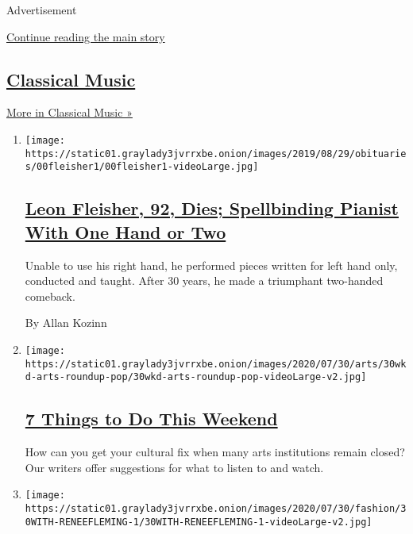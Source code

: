 Advertisement

\protect\hyperlink{after-mid1}{Continue reading the main story}

\hypertarget{classical-music}{%
\subsection{\texorpdfstring{\href{/spotlight/classical-music-reviews}{Classical
Music}}{Classical Music}}\label{classical-music}}

\href{/spotlight/classical-music-reviews}{More in Classical Music »}

\begin{enumerate}
\def\labelenumi{\arabic{enumi}.}
\item
  \texttt{[image: https://static01.graylady3jvrrxbe.onion/images/2019/08/29/obituaries/00fleisher1/00fleisher1-videoLarge.jpg]}

  \hypertarget{leon-fleisher-92-dies-spellbinding-pianist-with-one-hand-or-two}{%
  \subsection{\texorpdfstring{\href{/2020/08/02/arts/music/leon-fleisher-dead.html}{Leon
  Fleisher, 92, Dies; Spellbinding Pianist With One Hand or
  Two}}{Leon Fleisher, 92, Dies; Spellbinding Pianist With One Hand or Two}}\label{leon-fleisher-92-dies-spellbinding-pianist-with-one-hand-or-two}}

  Unable to use his right hand, he performed pieces written for left
  hand only, conducted and taught. After 30 years, he made a triumphant
  two-handed comeback.

  By Allan Kozinn
\item
  \texttt{[image: https://static01.graylady3jvrrxbe.onion/images/2020/07/30/arts/30wkd-arts-roundup-pop/30wkd-arts-roundup-pop-videoLarge-v2.jpg]}

  \hypertarget{7-things-to-do-this-weekend}{%
  \subsection{\texorpdfstring{\href{/2020/07/30/arts/things-to-do-weekend-coronavirus.html}{7
  Things to Do This
  Weekend}}{7 Things to Do This Weekend}}\label{7-things-to-do-this-weekend}}

  How can you get your cultural fix when many arts institutions remain
  closed? Our writers offer suggestions for what to listen to and watch.
\item
  \texttt{[image: https://static01.graylady3jvrrxbe.onion/images/2020/07/30/fashion/30WITH-RENEEFLEMING-1/30WITH-RENEEFLEMING-1-videoLarge-v2.jpg]}


\end{enumerate}
